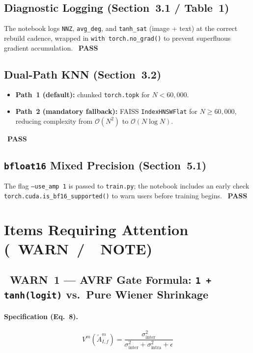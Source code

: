 \documentclass[12pt,a4paper]{article}
\newcommand{\PASS}{\textcolor{passgreen}{\ding{51}~\textbf{PASS}}}
\newcommand{\WARN}{\textcolor{warnambr}{\ding{115}~\textbf{WARN}}}
\newcommand{\INFO}{\textcolor{infoblue}{\ding{117}~\textbf{NOTE}}}
\begin{document}
\subsection{Diagnostic Logging (Section~3.1 / Table~1)}

The notebook logs \texttt{NNZ}, \texttt{avg\_deg}, and
\texttt{tanh\_sat} (image + text) at the correct rebuild cadence, wrapped in
\texttt{with torch.no\_grad()} to prevent superfluous gradient accumulation.
\PASS

\subsection{Dual-Path KNN (Section~3.2)}

\begin{itemize}[noitemsep]
  \item \textbf{Path~1 (default):} chunked \texttt{torch.topk} for
        $N < 60{,}000$.
  \item \textbf{Path~2 (mandatory fallback):} FAISS
        \texttt{IndexHNSWFlat} for $N \ge 60{,}000$, reducing complexity from
        $\mathcal{O}(N^2)$ to $\mathcal{O}(N\log N)$.
\end{itemize}
\PASS

\subsection{\texttt{bfloat16} Mixed Precision (Section~5.1)}

The flag \texttt{--use\_amp 1} is passed to \texttt{train.py}; the notebook
includes an early check \texttt{torch.cuda.is\_bf16\_supported()} to warn users
before training begins.  \PASS

\section{Items Requiring Attention (\WARN\ /\ \INFO)}

\subsection[\WARN{} 1 — AVRF Gate Formula]
           {\WARN~1 --- AVRF Gate Formula: \texttt{1 + tanh(logit)} vs.\ Pure Wiener Shrinkage}

\paragraph{Specification (Eq.~8).}
\[
  V^m\!\left(\tilde{A}^m_{I,f}\right)
  = \frac{\sigma^2_{\mathrm{inter}}}
         {\sigma^2_{\mathrm{inter}} + \sigma^2_{\mathrm{intra}} + \epsilon}
\]
\end{document}
